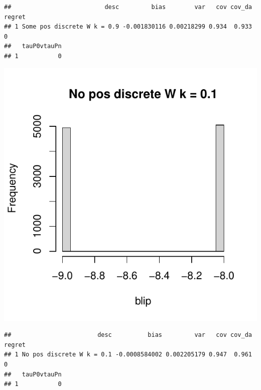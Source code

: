 \documentclass[11pt]{article}\usepackage[]{graphicx}\usepackage[table]{xcolor}
\makeatletter
\def\maxwidth{ %
  \ifdim\Gin@nat@width>\linewidth
    \linewidth
  \else
    \Gin@nat@width
  \fi
}
\newenvironment{kframe}{%
 \def\at@end@of@kframe{}%
 \ifinner\ifhmode%
  \def\at@end@of@kframe{\end{minipage}}%
  \begin{minipage}{\columnwidth}%
 \fi\fi%
 \def\FrameCommand##1{\hskip\@totalleftmargin \hskip-\fboxsep
 \colorbox{shadecolor}{##1}\hskip-\fboxsep
     \hskip-\linewidth \hskip-\@totalleftmargin \hskip\columnwidth}%
 \MakeFramed {\advance\hsize-\width
   \@totalleftmargin\z@ \linewidth\hsize
   \@setminipage}}%
 {\par\unskip\endMakeFramed%
 \at@end@of@kframe}
\newenvironment{knitrout}{}{} %
\makeatother
\begin{document}
\begin{knitrout}
\begin{kframe}\begin{verbatim}
##                          desc         bias        var   cov cov_da regret
## 1 Some pos discrete W k = 0.9 -0.001830116 0.00218299 0.934  0.933      0
##   tauP0vtauPn
## 1           0
\end{verbatim}
\end{kframe}
\includegraphics[width=\maxwidth]{figure/unnamed-chunk-4-5} 
\begin{kframe}\begin{verbatim}
##                        desc          bias         var   cov cov_da regret
## 1 No pos discrete W k = 0.1 -0.0008584002 0.002205179 0.947  0.961      0
##   tauP0vtauPn
## 1           0
\end{verbatim}
\end{kframe}

\end{knitrout}
\end{document}
